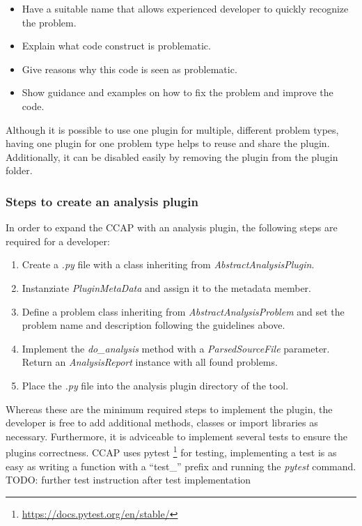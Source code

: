 \begin{itemize}
    \item Have a suitable name that allows experienced developer to quickly recognize the problem.
    \item Explain what code construct is problematic.
    \item Give reasons why this code is seen as problematic.
    \item Show guidance and examples on how to fix the problem and improve the code.
\end{itemize}
Although it is possible to use one plugin for multiple, different problem types, having one plugin for one problem type helps to reuse and share the plugin. Additionally, it can be disabled easily by removing the plugin from the plugin folder.

\subsubsection{Steps to create an analysis plugin}
In order to expand the CCAP with an analysis plugin, the following steps are required for a developer:
\begin{enumerate}
    \item Create a \textit{.py} file with a class inheriting from \textit{AbstractAnalysisPlugin}.
    \item Instanziate \textit{PluginMetaData} and assign it to the metadata member.
    \item Define a problem class inheriting from \textit{AbstractAnalysisProblem} and set the problem name and description following the guidelines above.
    \item Implement the \textit{do\_analysis} method with a \textit{ParsedSourceFile} parameter. Return an \textit{AnalysisReport} instance with all found problems.
    \item Place the \textit{.py} file into the analysis plugin directory of the tool.
\end{enumerate}
Whereas these are the minimum required steps to implement the plugin, the developer is free to add additional methods, classes or import libraries as necessary.
Furthermore, it is adviceable to implement several tests to ensure the plugins correctness. CCAP uses pytest \footnote{\url{https://docs.pytest.org/en/stable/}} for testing, implementing a test is as easy as writing a function with a \enquote{test\_} prefix and running the \textit{pytest} command. TODO: further test instruction after test implementation


